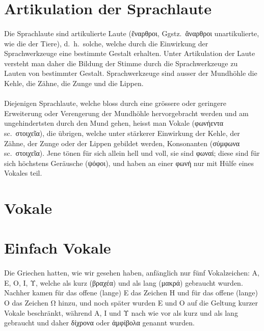 

\section{Artikulation der Sprachlaute}

\paragraph{} Die Sprachlaute sind artikulierte Laute (ἔναρθροι, Ggstz.\ ἄναρθροι
unartikulierte, wie die der Tiere), d.~h.\ solche, welche durch die Einwirkung
der Sprachwerkzeuge eine bestimmte Gestalt erhalten. Unter Artikulation der
Laute versteht man daher die Bildung der Stimme durch die Sprachwerkzeuge zu
Lauten von bestimmter Gestalt. Sprachwerkzeuge sind ausser der Mundhöhle die
Kehle, die Zähne, die Zunge und die Lippen.

\paragraph{} Diejenigen Sprachlaute, welche bloss durch eine grössere oder
geringere Erweiterung oder Verengerung der Mundhöhle hervorgebracht werden und
am ungehindertsten durch den Mund gehen, heisst man Vokale (φωνήεντα sc.\
στοιχεῖα), die übrigen, welche unter stärkerer Einwirkung der Kehle, der Zähne,
der Zunge oder der Lippen gebildet werden, Konsonanten (σύμφωνα sc.\ στοιχεῖα).
Jene tönen für sich allein hell und voll, sie sind φωναί; diese sind für sich
höchstens Geräusche (ψόφοι), und haben an einer φωνή nur mit Hülfe eines Vokales
teil.


\section*{Vokale}

\section{Einfach Vokale}

\paragraph{} Die Griechen hatten, wie wir
 gesehen haben, anfänglich nur fünf Vokalzeichen: Α, Ε, Ο, Ι, Υ, welche als kurz (βραχέα) und als lang (μακρά) gebraucht wurden. Nachher kamen für das offene (lange) Ε das Zeichen Η und für das offene (lange) Ο das Zeichen Ω hinzu, und noch später wurden Ε und Ο auf die Geltung kurzer Vokale beschränkt, während Α, Ι und Υ nach wie vor als kurz und als lang gebraucht und daher δίχρονα oder ἀμφίβολα genannt wurden.


